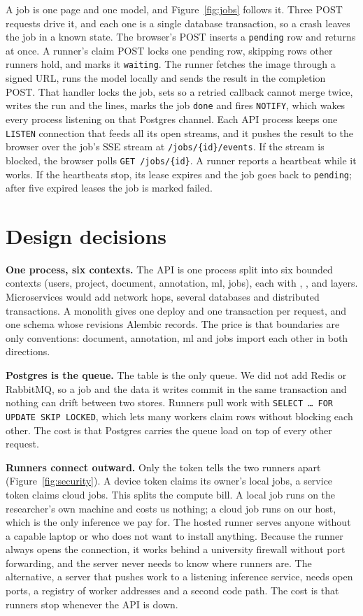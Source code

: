 \documentclass[11pt,a4paper]{article}
\newcommand{\choice}[1]{\par\smallskip\textbf{#1}\enspace}
\begin{document}
A job is one page and one model, and Figure~\ref{fig:jobs} follows it. Three POST requests drive it, and each one is a single database transaction, so a crash leaves the job in a known state. The browser's POST inserts a \texttt{pending} row and returns at once. A runner's claim POST locks one pending row, skipping rows other runners hold, and marks it \texttt{waiting}. The runner fetches the image through a signed URL, runs the model locally and sends the result in the completion POST. That handler locks the job, sets  so a retried callback cannot merge twice, writes the run and the lines, marks the job \texttt{done} and fires \texttt{NOTIFY}, which wakes every process listening on that Postgres channel. Each API process keeps one \texttt{LISTEN} connection that feeds all its open streams, and it pushes the result to the browser over the job's SSE stream at \texttt{/jobs/\{id\}/events}. If the stream is blocked, the browser polls \texttt{GET /jobs/\{id\}}. A runner reports a heartbeat while it works. If the heartbeats stop, its lease expires and the job goes back to \texttt{pending}; after five expired leases the job is marked failed.

\section{Design decisions}

\choice{One process, six contexts.} The API is one process split into six bounded contexts (users, project, document, annotation, ml, jobs), each with , ,  and  layers. Microservices would add network hops, several databases and distributed transactions. A monolith gives one deploy and one transaction per request, and one schema whose revisions Alembic records. The price is that boundaries are only conventions: document, annotation, ml and jobs import each other in both directions.

\choice{Postgres is the queue.} The  table is the only queue. We did not add Redis or RabbitMQ, so a job and the data it writes commit in the same transaction and nothing can drift between two stores. Runners pull work with \texttt{SELECT \dots\ FOR UPDATE SKIP LOCKED}, which lets many workers claim rows without blocking each other. The cost is that Postgres carries the queue load on top of every other request.

\choice{Runners connect outward.} Only the token tells the two runners apart (Figure~\ref{fig:security}). A device token claims its owner's local jobs, a service token claims cloud jobs. This splits the compute bill. A local job runs on the researcher's own machine and costs us nothing; a cloud job runs on our host, which is the only inference we pay for. The hosted runner serves anyone without a capable laptop or who does not want to install anything. Because the runner always opens the connection, it works behind a university firewall without port forwarding, and the server never needs to know where runners are. The alternative, a server that pushes work to a listening inference service, needs open ports, a registry of worker addresses and a second code path. The cost is that runners stop whenever the API is down.
\end{document}
